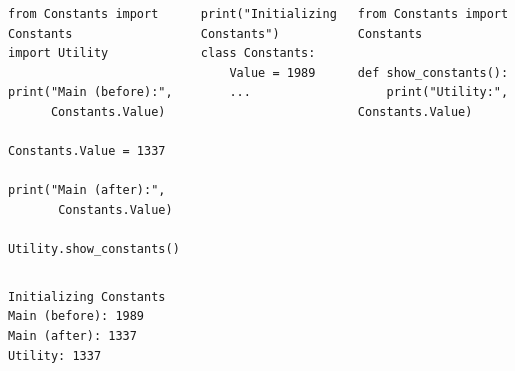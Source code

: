 
\begin{frame}[fragile]
%
\vspace{-12pt}
\begin{columns}[T]
\begin{codebox}
\begin{verbatim}
from Constants import Constants
import Utility

print("Main (before):",
      Constants.Value)

Constants.Value = 1337

print("Main (after):",
       Constants.Value)

Utility.show_constants()
\end{verbatim}
\end{codebox}
%
\begin{codebox}
\begin{verbatim}
print("Initializing Constants")
class Constants:
    Value = 1989
    ...
\end{verbatim}
\end{codebox}
%
\vspace{-10pt}
\begin{codebox}
\begin{verbatim}
from Constants import Constants

def show_constants():
    print("Utility:", Constants.Value)
\end{verbatim}
\end{codebox}
\end{columns}
%
\vspace{-4pt}
\begin{cmdbox}[Output]
\begin{verbatim}
Initializing Constants
Main (before): 1989
Main (after): 1337
Utility: 1337
\end{verbatim}
\end{cmdbox}
%
\end{frame}


